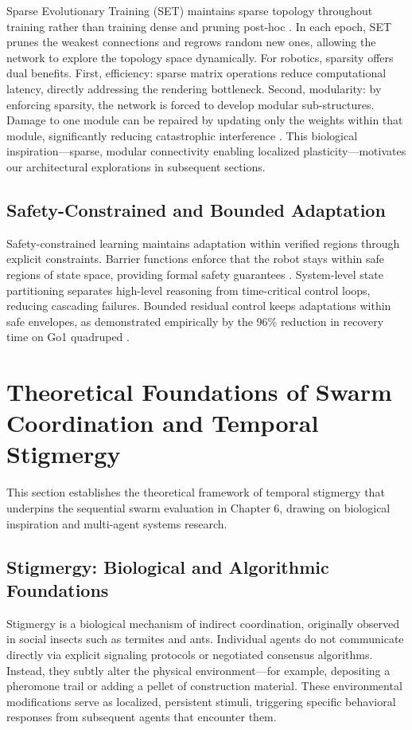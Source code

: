 \documentclass[12pt,a4paper,oneside]{report}
\begin{document}
Sparse Evolutionary Training (SET) maintains sparse topology throughout training rather than training dense and pruning post-hoc \cite{mocanu2018scalable}. In each epoch, SET prunes the weakest connections and regrows random new ones, allowing the network to explore the topology space dynamically. For robotics, sparsity offers dual benefits. First, efficiency: sparse matrix operations reduce computational latency, directly addressing the rendering bottleneck. Second, modularity: by enforcing sparsity, the network is forced to develop modular sub-structures. Damage to one module can be repaired by updating only the weights within that module, significantly reducing catastrophic interference \cite{frankle2018lottery, mocanu2018scalable}. This biological inspiration—sparse, modular connectivity enabling localized plasticity—motivates our architectural explorations in subsequent sections.

\subsection{Safety-Constrained and Bounded Adaptation}

Safety-constrained learning maintains adaptation within verified regions through explicit constraints. Barrier functions enforce that the robot stays within safe regions of state space, providing formal safety guarantees \cite{brunke2021safe}. System-level state partitioning separates high-level reasoning from time-critical control loops, reducing cascading failures. Bounded residual control keeps adaptations within safe envelopes, as demonstrated empirically by the 96\% reduction in recovery time on Go1 quadruped \cite{jayasinghe2026residual}.

\section{Theoretical Foundations of Swarm Coordination and Temporal Stigmergy}

This section establishes the theoretical framework of temporal stigmergy that underpins the sequential swarm evaluation in Chapter 6, drawing on biological inspiration and multi-agent systems research.

\subsection{Stigmergy: Biological and Algorithmic Foundations}

Stigmergy is a biological mechanism of indirect coordination, originally observed in social insects such as termites and ants. Individual agents do not communicate directly via explicit signaling protocols or negotiated consensus algorithms. Instead, they subtly alter the physical environment—for example, depositing a pheromone trail or adding a pellet of construction material. These environmental modifications serve as localized, persistent stimuli, triggering specific behavioral responses from subsequent agents that encounter them.
\end{document}
